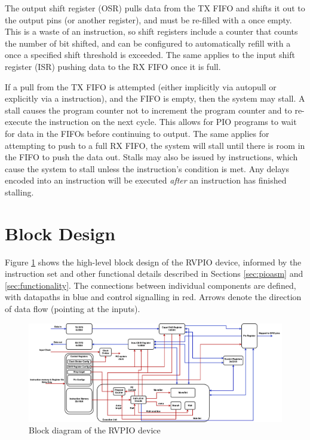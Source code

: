 The output shift register (OSR) pulls data from the TX FIFO and shifts it out to the output pins (or another register), and must be re-filled with a  once empty. This is a waste of an instruction, so shift registers include a counter that counts the number of bit shifted, and can be configured to automatically refill with a  once a specified shift threshold is exceeded. The same applies to the input shift register (ISR) pushing data to the RX FIFO once it is full.

If a pull from the TX FIFO is attempted (either implicitly via autopull or explicitly via a  instruction), and the FIFO is empty, then the system may stall. A stall causes the program counter not to increment the program counter and to re-execute the instruction on the next cycle. This allows for PIO programs to wait for data in the FIFOs before continuing to output. The same applies for attempting to push to a full RX FIFO, the system will stall until there is room in the FIFO to push the data out. Stalls may also be issued by  instructions, which cause the system to stall unless the instruction's condition is met. Any delays encoded into an instruction will be executed \textit{after} an instruction has finished stalling.

\section{Block Design}

Figure \ref{fig:bd} shows the high-level block design of the RVPIO device, informed by the instruction set and other functional details described in Sections \ref{sec:pioasm} and \ref{sec:functionality}. The connections between individual components are defined, with datapaths in blue and control signalling in red. Arrows denote the direction of data flow (pointing at the inputs).

\begin{figure}[H]
    \centering
    \includegraphics[width=1.1\textwidth]{../img/bd.png}
    \caption{Block diagram of the RVPIO device}
    \label{fig:bd}
\end{figure}

